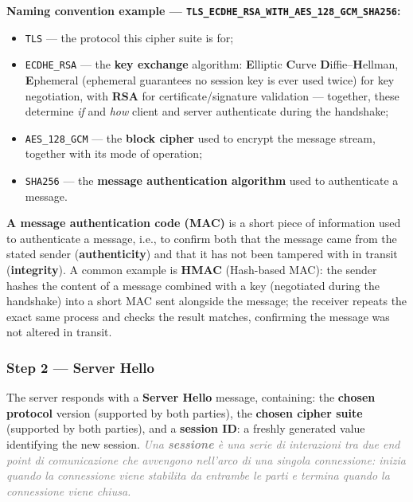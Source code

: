 \documentclass[12pt, a4paper]{article}
\begin{document}
\textbf{Naming convention example --- \texttt{TLS\_ECDHE\_RSA\_WITH\_AES\_128\_GCM\_SHA256}:}
\begin{itemize}
    \item \texttt{TLS} --- the protocol this cipher suite is for;
    \item \texttt{ECDHE\_RSA} --- the \textbf{key exchange} algorithm: \textbf{E}lliptic \textbf{C}urve \textbf{D}iffie--\textbf{H}ellman, \textbf{E}phemeral (ephemeral guarantees no session key is ever used twice) for key negotiation, with \textbf{RSA} for certificate/signature validation --- together, these determine \emph{if} and \emph{how} client and server authenticate during the handshake;
    \item \texttt{AES\_128\_GCM} --- the \textbf{block cipher} used to encrypt the message stream, together with its mode of operation;
    \item \texttt{SHA256} --- the \textbf{message authentication algorithm} used to authenticate a message.
\end{itemize}
\textcolor{blue!50!black}{\textbf{A message authentication code (MAC)}} is a short piece of information used to authenticate a message, i.e., to confirm both that the message came from the stated sender (\textbf{authenticity}) and that it has not been tampered with in transit (\textbf{integrity}). A common example is \textbf{HMAC} (Hash-based MAC): the sender hashes the content of a message combined with a key (negotiated during the handshake) into a short MAC sent alongside the message; the receiver repeats the exact same process and checks the result matches, confirming the message was not altered in transit.

\subsubsection*{Step 2 --- Server Hello}
The server responds with a \textbf{Server Hello} message, containing: the \textbf{chosen protocol} version (supported by both parties), the \textbf{chosen cipher suite} (supported by both parties), and a \textbf{session ID}: a freshly generated value identifying the new session. \textcolor{gray}{\textit{Una \textbf{sessione} è una serie di interazioni tra due end point di comunicazione che avvengono nell'arco di una singola connessione: inizia quando la connessione viene stabilita da entrambe le parti e termina quando la connessione viene chiusa.}}
\end{document}
